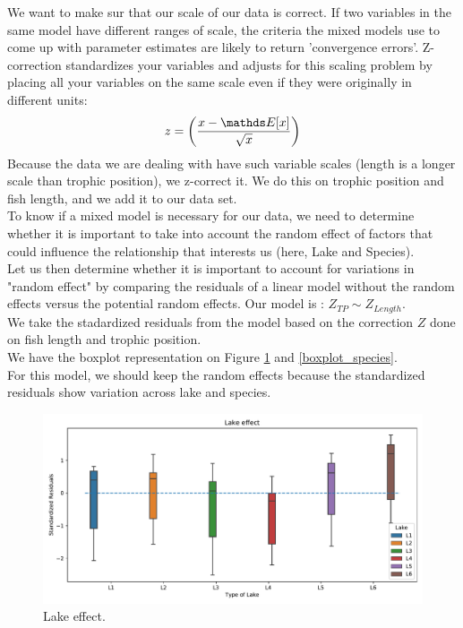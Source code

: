 \documentclass{article}
\begin{document}
We want to make sur that our scale of our data is correct. If two variables in the same model have different ranges of scale, the criteria the mixed models use to come up with parameter estimates are likely to return 'convergence errors'. Z-correction standardizes your variables and adjusts for this scaling problem by placing all your variables on the same scale even if they were originally in different units:
\begin{equation*}
    z = \left(\frac{x - \bbE[x]}{\sqrt{x}}\right)
\end{equation*}
Because the data we are dealing with have such variable scales (length is a longer scale than trophic position), we z-correct it. We do this on trophic position and fish length, and we add it to our data set. \\
To know if a mixed model is necessary for our data, we need to determine whether it is important to take into account the random effect of factors that could influence the relationship that interests us (here, Lake and Species).\\
Let us then determine whether it is important to account for variations in "random effect" by comparing
the residuals of a linear model without the random effects versus the potential random effects.
Our model is : $Z_{TP} \sim Z_{Length}$.\\
We take the stadardized residuals from the model based on the correction $Z$ done on fish length and trophic position.\\
We have the boxplot representation on Figure \ref{boxplot_lake} and \ref{boxplot_species}.\\
For this model, we should keep the random effects because the standardized residuals show variation across lake and species.
\begin{figure}[h!]
    \centering
    \includegraphics[scale = 0.6]{images/boxplot_lake_effect.pdf}
    \caption{Lake effect.}
    \label{boxplot_lake}
\end{figure}
    
\end{document}
